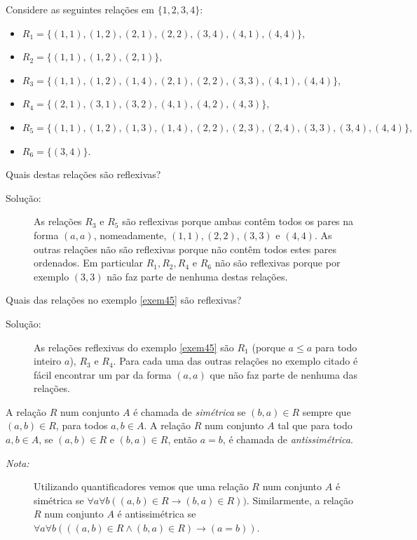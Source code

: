 \label{exem45}
\begin{exmp}
Considere as seguintes relações em $\{1,2,3,4\}$:
	\begin{itemize}
		\item $R_1 = \{(1,1),(1,2),(2,1),(2,2),(3,4),(4,1),(4,4)\},$
		\item $R_2 = \{(1,1),(1,2),(2,1)\},$
		\item $R_3 = \{(1,1),(1,2),(1,4),(2,1),(2,2),(3,3),(4,1),(4,4)\},$
		\item $R_4 = \{(2,1),(3,1),(3,2),(4,1),(4,2),(4,3)\},$
		\item $R_5 = \{(1,1),(1,2),(1,3),(1,4),(2,2),(2,3),
		(2,4),(3,3),(3,4),(4,4)\},$
		\item $R_6 = \{(3,4)\}.$
	\end{itemize}
	Quais destas relações são reflexivas?
	
\begin{description}
\item[Solução:]As relações $R_3$ e $R_5$ são reflexivas porque ambas contêm
todos os pares na forma $(a,a)$, nomeadamente, $(1,1), (2,2), (3,3)$ e $(4,4)$.
As outras relações não são reflexivas porque não contêm todos estes pares
ordenados. Em particular $R_1, R_2, R_4$ e $R_6$ não são reflexivas porque
por exemplo $(3,3)$ não faz parte de nenhuma destas relações.
\end{description}
\end{exmp}

\label{exem46}
\begin{exmp}
	Quais das relações no exemplo \ref{exem45} são reflexivas?
	\begin{description}
	\item[Solução:]As relações reflexivas do exemplo \ref{exem45} são $R_1$ (porque
	$a \leq a$ para todo inteiro $a$), $R_3$ e $R_4$. Para cada uma das outras
	relações no exemplo citado é fácil encontrar um par da forma $(a, a)$ que não
	faz parte de nenhuma das relações.
	\end{description}
\end{exmp}

\label{def44}
\begin{defn}
	A relação $R$ num conjunto $A$ é chamada de \emph{simétrica} se $(b,a) \in R$
	sempre que $(a,b) \in R$, para todos $a, b \in A.$ A relação $R$ num conjunto
	$A$ tal que para todo $a,b \in A$, se $(a,b) \in R$ e $(b,a) \in R$, então $a =
	b$, é chamada de \emph{antissimétrica}.
	
	\begin{description}
	\item[\emph{Nota:}]Utilizando quantificadores vemos que uma relação $R$ num
	conjunto $A$ é simétrica se $\forall{a}\forall{b}((a,b) \in R \to (b,a) \in
	R))$. Similarmente, a relação $R$ num conjunto $A$ é antissimétrica se
	$\forall{a}\forall{b}(((a,b) \in R \land (b,a) \in R) \to (a = b)).$
	\end{description}
\end{defn}


